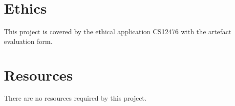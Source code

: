 \documentclass[11pt]{report}
\begin{document}
    \section*{Ethics}

    This project is covered by the ethical application CS12476 with the artefact evaluation form.

    \section*{Resources}

    There are no resources required by this project.
\end{document}
